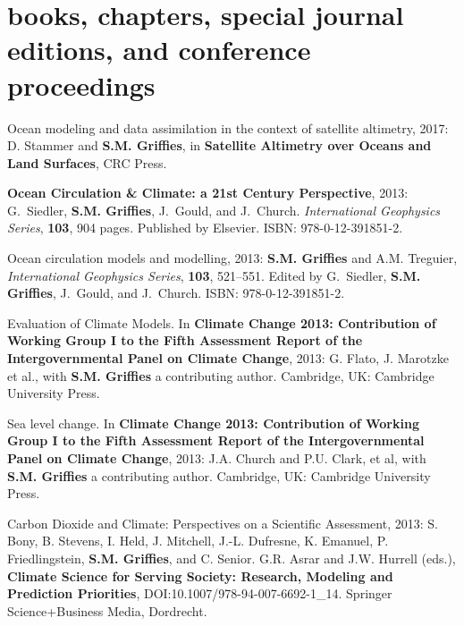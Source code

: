 \section*{\sc \color{Maroon} books, chapters, special journal editions, and
  conference proceedings}


\begin{etaremune}

\item Ocean modeling and data assimilation in the context of satellite altimetry, 2017: D. Stammer and {\bf S.M. Grif\/f\/ies}, in  {\bf Satellite Altimetry over Oceans and Land Surfaces}, CRC Press.
  
\item {\bf Ocean Circulation \& Climate: a 21st Century Perspective},
  2013: G.\ Siedler, {\bf S.M. Griffies}, J.\ Gould, and J.\ Church.
  {\it International Geophysics Series}, {\bf 103}, 904
  pages. Published by Elsevier.  ISBN: 978-0-12-391851-2.

\item Ocean circulation models and modelling, 2013: {\bf
    S.M. Griffies} and A.M. Treguier, {\it International Geophysics
    Series}, {\bf 103}, 521--551.  Edited by G.\ Siedler, {\bf
    S.M. Griffies}, J.\ Gould, and J.\ Church.  ISBN:
  978-0-12-391851-2.

\item Evaluation of Climate Models.  In {\bf Climate Change 2013:
    Contribution of Working Group I to the Fifth Assessment Report of
    the Intergovernmental Panel on Climate Change}, 2013: G. Flato,
  J. Marotzke et al., with {\bf S.M. Grif\/f\/ies} a contributing
  author.   Cambridge, UK: Cambridge University Press.

\item Sea level change.  In {\bf Climate Change 2013: Contribution of
    Working Group I to the Fifth Assessment Report of the
    Intergovernmental Panel on Climate Change}, 2013: J.A. Church and
  P.U. Clark, et al, with {\bf S.M. Grif\/f\/ies} a contributing
  author.  Cambridge, UK: Cambridge University Press.

\item Carbon Dioxide and Climate: Perspectives on a Scientific
  Assessment, 2013: S. Bony, B. Stevens, I. Held, J. Mitchell,
  J.-L. Dufresne, K. Emanuel, P. Friedlingstein, {\bf
    S.M. Grif\/f\/ies}, and C. Senior. G.R. Asrar and J.W. Hurrell
  (eds.), {\bf Climate Science for Serving Society: Research, Modeling
    and Prediction Priorities}, DOI:10.1007/978-94-007-6692-1\_14.
  Springer Science+Business Media, Dordrecht.


\end{etaremune}
